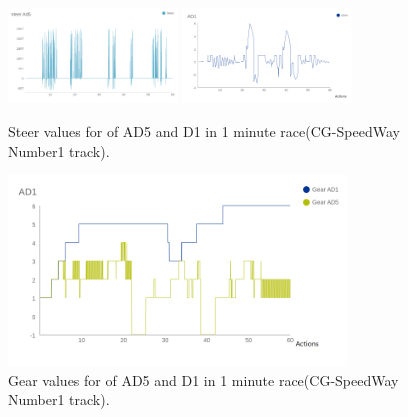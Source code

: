 \documentclass{llncs}
\begin{document}
\begin{figure}[h!]
	
	\centering
	\includegraphics[width=0.4\textwidth]{fig/AD5steer.PNG}
	\includegraphics[width=0.4\textwidth]{fig/AD1steer.PNG}
	\begin{minipage}{10cm}
		\centering
		\caption{\footnotesize Steer values for of AD5 and D1 in 1 minute race(CG-SpeedWay Number1 track).}
		\label{steer5min}
	\end{minipage} 
	
\end{figure}

\begin{figure}[h!]
	
	\centering
	\includegraphics[width=0.8\textwidth]{fig/AD1gear.PNG}
	
	\begin{minipage}{10cm}
		\centering
		\caption{\footnotesize Gear values for of AD5 and D1 in 1 minute race(CG-SpeedWay Number1 track). }
		\label{gear1min}
	\end{minipage} 
	
\end{figure}
\end{document}
